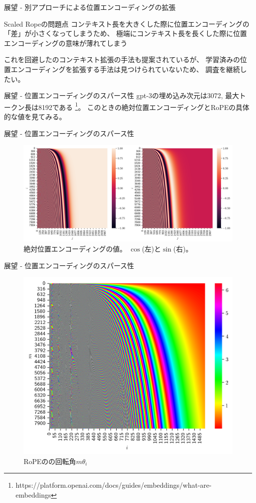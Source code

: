 \documentclass[dvipdfm]{beamer}
\begin{document}
    \begin{frame}{展望 - 別アプローチによる位置エンコーディングの拡張}
        \begin{alertblock}{Scaled Ropeの問題点}
            コンテキスト長を大きくした際に位置エンコーディングの「差」が小さくなってしまうため、
            極端にコンテキスト長を長くした際に位置エンコーディングの意味が薄れてしまう
        \end{alertblock}
        これを回避したのコンテキスト拡張の手法も提案されているが、
        学習済みの位置エンコーディングを拡張する手法は見つけられていないため、
        調査を継続したい。
    \end{frame}
    \begin{frame}{展望 - 位置エンコーディングのスパース性}
        gpt-3の埋め込み次元は3072, 最大トークン長は8192である
        \footnote{https://platform.openai.com/docs/guides/embeddings/what-are-embeddings}。
        このときの絶対位置エンコーディングとRoPEの具体的な値を見てみる。
    \end{frame}
    \begin{frame}{展望 - 位置エンコーディングのスパース性}
        \begin{figure}
            \centering
            \includegraphics[width=1\linewidth]{absolute.png}
            \caption{
                絶対位置エンコーディングの値。
                $\cos$(左)と$\sin$(右)。
            }
        \end{figure}
    \end{frame}
    \begin{frame}{展望 - 位置エンコーディングのスパース性}
        \begin{figure}
            \centering
            \includegraphics[width=0.6\linewidth]{rope.png}
            \caption{
                RoPEのの回転角$m\theta_i$
            }
        \end{figure}
    \end{frame}
\end{document}
